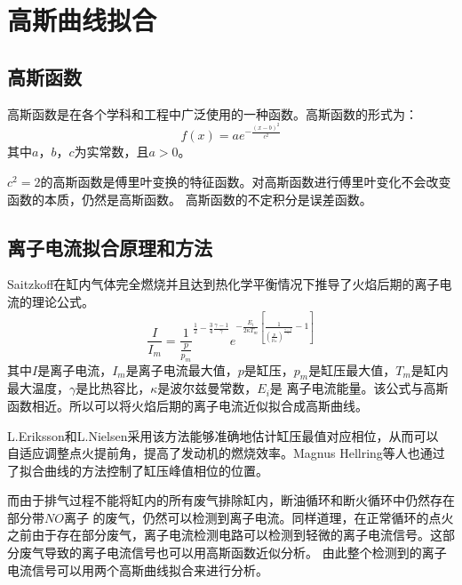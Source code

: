 \section{高斯曲线拟合}
\subsection{高斯函数}
高斯函数是在各个学科和工程中广泛使用的一种函数。高斯函数的形式为：
\begin{equation}
	f(x)=ae^{-\frac{(x-b)^2}{c^2}}
\end{equation}
其中$a$，$b$，$c$为实常数，且$a>0$。
\par  $c^2=2$的高斯函数是傅里叶变换的特征函数\cite{wcpyh2006}。对高斯函数进行傅里叶变化不会改变函数的本质，仍然是高斯函数。
高斯函数的不定积分是误差函数。\par
\subsection{离子电流拟合原理和方法}
Saitzkoff\cite{saitzkoff1996ionization}在缸内气体完全燃烧并且达到热化学平衡情况下推导了火焰后期的离子电流的理论公式。
\begin{equation}
	\frac{I}{I_{m}}=\frac{1}{\frac{p}{p_m}}^{\frac{1}{2}-\frac{3}{4}\frac{\gamma -1}{\gamma}}e^{-\frac{E_i}{2\kappa T_m}[\frac{1}{(\frac{p}{p_m})^{\frac{\gamma -1}{\gamma}}}-1]}
\end{equation}
其中$I$是离子电流，$I_{m}$是离子电流最大值，$p$是缸压，$p_{m}$是缸压最大值，$T_{m}$是缸内最大温度，$\gamma$是比热容比，$\kappa$是波尔兹曼常数，$E_{i}$是
离子电流能量。该公式与高斯函数相近。所以可以将火焰后期的离子电流近似拟合成高斯曲线。\par
L.Eriksson和L.Nielsen\cite{eriksson1996ignition,eriksson1997closed,eriksson1997ionization}采用该方法能够准确地估计缸压最值对应相位，从而可以
自适应调整点火提前角，提高了发动机的燃烧效率。Magnus Hellring等人也通过了拟合曲线的方法控制了缸压峰值相位的位置\cite{hellring2001comparison}。\par
而由于排气过程不能将缸内的所有废气排除缸内，断油循环和断火循环中仍然存在部分带$NO$离子
的废气，仍然可以检测到离子电流。同样道理，在正常循环的点火之前由于存在部分废气，离子电流检测电路可以检测到轻微的离子电流信号。这部分废气导致的离子电流信号也可以用高斯函数近似分析。
由此整个检测到的离子电流信号可以用两个高斯曲线拟合来进行分析。





